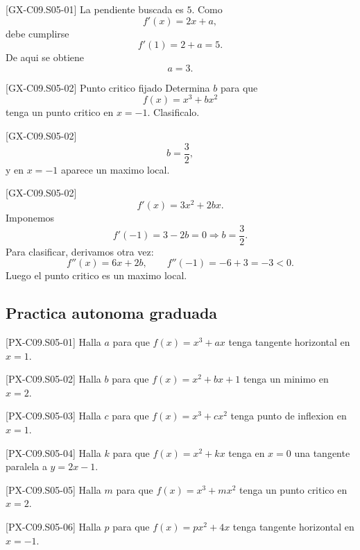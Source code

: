 \begin{fullsolution}{[GX-C09.S05-01]}
La pendiente buscada es \(5\). Como
\[
f'(x)=2x+a,
\]
debe cumplirse
\[
f'(1)=2+a=5.
\]
De aqui se obtiene
\[
a=3.
\]
\end{fullsolution}

\begin{guidedexercise}{[GX-C09.S05-02] Punto critico fijado}
Determina \(b\) para que
\[
f(x)=x^3+bx^2
\]
tenga un punto critico en \(x=-1\). Clasificalo.
\end{guidedexercise}

\begin{shortanswer}{[GX-C09.S05-02]}
\[
b=\frac{3}{2},
\]
y en \(x=-1\) aparece un maximo local.
\end{shortanswer}

\begin{fullsolution}{[GX-C09.S05-02]}
\[
f'(x)=3x^2+2bx.
\]
Imponemos
\[
f'(-1)=3-2b=0 \Longrightarrow b=\frac{3}{2}.
\]
Para clasificar, derivamos otra vez:
\[
f''(x)=6x+2b,\qquad f''(-1)=-6+3=-3<0.
\]
Luego el punto critico es un maximo local.
\end{fullsolution}

\subsection*{Practica autonoma graduada}
\begin{exercise}{[PX-C09.S05-01] Halla \(a\) para que \(f(x)=x^3+ax\) tenga tangente horizontal en \(x=1\).}
\end{exercise}
\begin{exercise}{[PX-C09.S05-02] Halla \(b\) para que \(f(x)=x^2+bx+1\) tenga un minimo en \(x=2\).}
\end{exercise}
\begin{exercise}{[PX-C09.S05-03] Halla \(c\) para que \(f(x)=x^3+cx^2\) tenga punto de inflexion en \(x=1\).}
\end{exercise}
\begin{exercise}{[PX-C09.S05-04] Halla \(k\) para que \(f(x)=x^2+kx\) tenga en \(x=0\) una tangente paralela a \(y=2x-1\).}
\end{exercise}
\begin{exercise}{[PX-C09.S05-05] Halla \(m\) para que \(f(x)=x^3+mx^2\) tenga un punto critico en \(x=2\).}
\end{exercise}
\begin{exercise}{[PX-C09.S05-06] Halla \(p\) para que \(f(x)=px^2+4x\) tenga tangente horizontal en \(x=-1\).}
\end{exercise}

